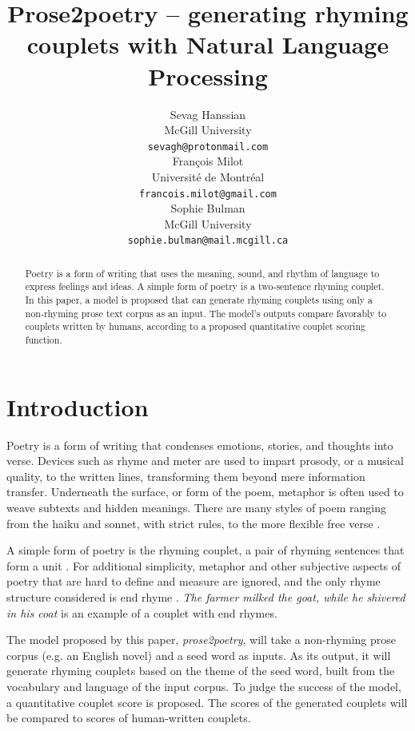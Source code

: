 \documentclass[11pt,a4paper]{article}
\title{Prose2poetry -- generating rhyming couplets with Natural Language Processing}
\author{Sevag Hanssian \\
  McGill University \\
  \texttt{sevagh@protonmail.com} \\\And
  François Milot \\
  Université de Montréal \\
  \texttt{francois.milot@gmail.com} \\\AND Sophie Bulman \\
  McGill University \\
  \texttt{sophie.bulman@mail.mcgill.ca}}
\date{}
\begin{document}
\maketitle
\begin{abstract}
	Poetry is a form of writing that uses the meaning, sound, and rhythm of language to express feelings and ideas. A simple form of poetry is a two-sentence rhyming couplet. In this paper, a model is proposed that can generate rhyming couplets using only a non-rhyming prose text corpus as an input. The model's outputs compare favorably to couplets written by humans, according to a proposed quantitative couplet scoring function.
\end{abstract}

\section{Introduction}
\label{sec:intro}

Poetry is a form of writing that condenses emotions, stories, and thoughts into verse. Devices such as rhyme and meter are used to impart prosody, or a musical quality, to the written lines, transforming them beyond mere information transfer. Underneath the surface, or form of the poem, metaphor is often used to weave subtexts and hidden meanings. There are many styles of poem ranging from the haiku and sonnet, with strict rules, to the more flexible free verse \citep{poem_type}.

A simple form of poetry is the rhyming couplet, a pair of rhyming sentences that form a unit \cite{couplet_def}. For additional simplicity, metaphor and other subjective aspects of poetry that are hard to define and measure are ignored, and the only rhyme structure considered is end rhyme \cite{end_rhyme_def}. \textit{The farmer milked the goat, while he shivered in his coat} is an example of a couplet with end rhymes.

The model proposed by this paper, \textit{prose2poetry}, will take a non-rhyming prose corpus (e.g. an English novel) and a seed word as inputs. As its output, it will generate rhyming couplets based on the theme of the seed word, built from the vocabulary and language of the input corpus. To judge the success of the model, a quantitative couplet score is proposed. The scores of the generated couplets will be compared to scores of human-written couplets.

\end{document}
